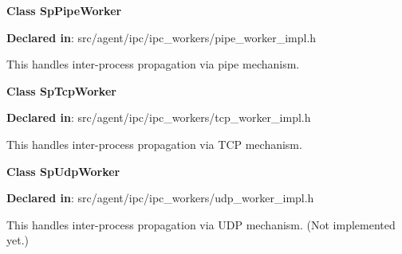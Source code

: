 \textbf{Class SpPipeWorker}

\textbf{Declared in}: src/agent/ipc/ipc\_workers/pipe\_worker\_impl.h

This handles inter-process propagation via pipe mechanism.

\textbf{Class SpTcpWorker}

\textbf{Declared in}: src/agent/ipc/ipc\_workers/tcp\_worker\_impl.h

This handles inter-process propagation via TCP mechanism.

\textbf{Class SpUdpWorker}

\textbf{Declared in}: src/agent/ipc/ipc\_workers/udp\_worker\_impl.h

This handles inter-process propagation via UDP mechanism.
(Not implemented yet.)
